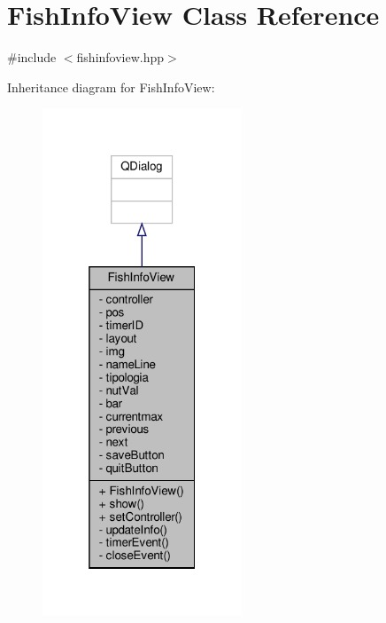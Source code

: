 \hypertarget{classFishInfoView}{}\section{Fish\+Info\+View Class Reference}
\label{classFishInfoView}


{\ttfamily \#include $<$fishinfoview.\+hpp$>$}



Inheritance diagram for Fish\+Info\+View\+:\nopagebreak
\begin{figure}[H]
\begin{center}
\leavevmode
\includegraphics[width=169pt]{classFishInfoView__inherit__graph}
\end{center}
\end{figure}


